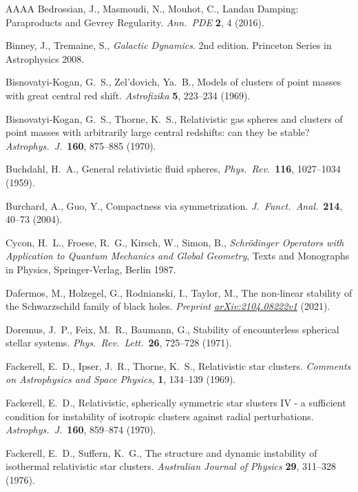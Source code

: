 \documentclass[11pt]{article}
\begin{document}
\begin{thebibliography}{AAAA}
  {\sc Bedrossian, J., Masmoudi, N., Mouhot, C.},
  Landau Damping: Paraproducts and Gevrey Regularity.
  {\em Ann.\ PDE} 
  {\bf 2}, 4 (2016).	

  {\sc Binney, J., Tremaine, S.},
  {\em Galactic Dynamics}. 2nd edition.
  Princeton Series in Astrophysics 2008.

  {\sc Bisnovatyi-Kogan, G.~S., Zel'dovich, Ya.~B.},
  Models of clusters of point masses with great central red shift.
  {\em Astrofizika}
  {\bf 5}, 223--234 (1969).

  {\sc Bisnovatyi-Kogan, G.~S., Thorne, K.~S.},
  Relativistic gas spheres and clusters of point masses with
  arbitrarily large central redshifts: can they be stable?
  {\em Astrophys.\ J.}\ 
  {\bf 160}, 875--885 (1970).

  {\sc Buchdahl, H.~A.},
  General relativistic fluid spheres,
  {\em Phys.\ Rev.}\
  {\bf 116}, 1027--1034 (1959).

  {\sc Burchard, A., Guo, Y.},
  Compactness via symmetrization.
  {\em J.~Funct.\ Anal.}\
  {\bf 214}, 40--73 (2004).

  {\sc Cycon, H.~L., Froese, R.~G., Kirsch, W., Simon, B.}, 
  {\em Schr\"odinger Operators with Application to Quantum Mechanics
    and Global Geometry}, 
  Texts and Monographs in Physics, Springer-Verlag, Berlin 1987.

\bibitem{DaHoRoTa} %
  {\sc Dafermos, M., Holzegel, G., Rodnianski, I., Taylor, M.},
  The non-linear stability of the Schwarzschild family of black holes.
  {\em Preprint \href{https://arxiv.org/abs/2104.08222v1}{arXiv:2104.08222v1}}
   (2021).
  
\bibitem{DoFeBa} %
  {\sc Doremus, J.~P., Feix, M.~R., Baumann, G.},
  Stability of encounterless spherical stellar systems.
  {\em Phys.\ Rev.\ Lett.}\
  {\bf 26}, 725--728 (1971).

\bibitem{FaIpTh} %
  {\sc Fackerell, E.~D., Ipser, J.~R., Thorne, K.~S.},
  Relativistic star clusters.
  {\em Comments on Astrophysics and Space Physics,} {\bf 1}, 134--139 (1969).

\bibitem{Fa1970} %
  {\sc Fackerell, E.~D.},
  Relativistic, spherically symmetric star slusters IV - a sufficient
  condition for instability of isotropic clusters against radial perturbations.
  {\em Astrophys.\ J.}\  
  {\bf 160}, 859--874 (1970).

\bibitem{FaSu1976a} %
  {\sc Fackerell, E.~D., Suffern, K.~G.},
  The structure and dynamic instability of isothermal
  relativistic star clusters.
  {\em Australian Journal of Physics} 
  {\bf 29}, 311--328 (1976).


\end{thebibliography}
\end{document}
